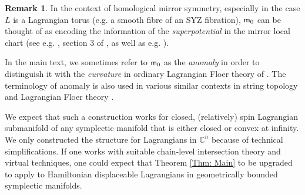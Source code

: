 \documentclass[10pt]{amsart}
\numberwithin{equation}{section}
\theoremstyle{plain}
\theoremstyle{definition}
\newtheorem{remark}[theorem]{Remark}
\theoremstyle{remark}
\numberwithin{equation}{section}
\newcommand{\C}{\mathbb{C}}
\newcommand{\mm}{\textup{\textsf{m}}}
\begin{document}
\begin{remark}
	In the context of homological mirror symmetry, especially in the case $L$ is a Lagrangian torus (e.g. a smooth fibre of an SYZ fibration), $\mm_0$ can be thought of as encoding the information of the \emph{superpotential} in the mirror local chart  (see e.g. \cite{AbouzaidLect}, section 3 of \cite{AurouxTDuality}, as well as e.g. \cite{TonkonogEnum,YuanHangThesis}).
	
	In the main text, we sometimes refer to $\mm_0$ as the \emph{anomaly}  in order to distinguish it with the \emph{curvature} in ordinary Lagrangian Floer theory of \cite{FOOO1}. The terminology of anomaly is also used in various similar contexts in string topology \cite{SullivanStringSurvey} and Lagrangian Floer theory \cite{FOOO1,FOOO2}.
\end{remark}




We expect that such a construction works for closed, (relatively) spin Lagrangian submanifold of any  symplectic manifold that is either closed or convex at infinity. We only constructed the structure for Lagrangians in $\C^n$ because of  technical simplifications.
If one works with suitable chain-level intersection theory and virtual techniques, one could expect that Theorem \ref{Thm: Main} to be upgraded to apply to Hamiltonian displaceable Lagrangians in geometrically bounded symplectic manifolds.
\end{document}
